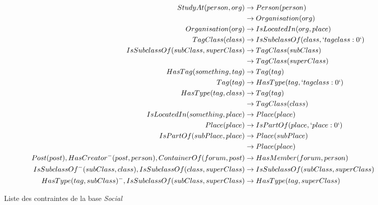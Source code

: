\begin{figure}[H]
    \ContinuedFloat
    \centering
    \begin{adjustbox}{max width=\linewidth,max height=.5\textheight}
        \parbox{\linewidth}{\begin{align*}
                StudyAt(person, org)                                             & \to Person(person)                     \\
                                                                                 & \to Organisation(org)                  \\
                Organisation(org)                                                & \to IsLocatedIn(org, place)            \\
                TagClass(class)                                                  & \to IsSubclassOf(class, `tagclass:0`)  \\
                IsSubclassOf(subClass, superClass)                               & \to TagClass(subClass)                 \\
                                                                                 & \to TagClass(superClass)               \\
                HasTag(something, tag)                                           & \to Tag(tag)                           \\
                Tag(tag)                                                         & \to HasType(tag, `tagclass:0`)         \\
                HasType(tag, class)                                              & \to Tag(tag)                           \\
                                                                                 & \to TagClass(class)                    \\
                IsLocatedIn(something, place)                                    & \to Place(place)                       \\
                Place(place)                                                     & \to IsPartOf(place, `place:0`)         \\
                IsPartOf(subPlace, place)                                        & \to Place(subPlace)                    \\
                                                                                 & \to Place(place)                       \\
                Post(post), HasCreator^-(post, person), ContainerOf(forum, post) & \to HasMember(forum, person)           \\
                IsSubclassOf^-(subClass, class), IsSubclassOf(class, superClass) & \to IsSubclassOf(subClass, superClass) \\
                HasType(tag, subClass)^-, IsSubclassOf(subClass, superClass)     & \to HasType(tag, superClass)
            \end{align*}}
    \end{adjustbox}
    \caption{Liste des contraintes de la base \emph{Social}}
\end{figure}
